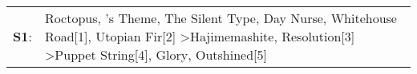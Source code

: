 \begin{supertabular}{p{0.03\textwidth}p{0.92\textwidth}}
 \textbf{S1}:  &  Roctopus\textsuperscript{}, 's Theme\textsuperscript{}, \enspace The Silent Type\textsuperscript{}, \enspace Day Nurse\textsuperscript{}, \enspace Whitehouse Road[1]\textsuperscript{}, \enspace Utopian Fir[2]\textsuperscript{} \textgreater \enspace Hajimemashite\textsuperscript{}, \enspace Resolution[3]\textsuperscript{} \textgreater \enspace Puppet String[4]\textsuperscript{}, \enspace Glory\textsuperscript{}, \enspace Outshined[5]\textsuperscript{}  \enspace  \\
\end{supertabular}
